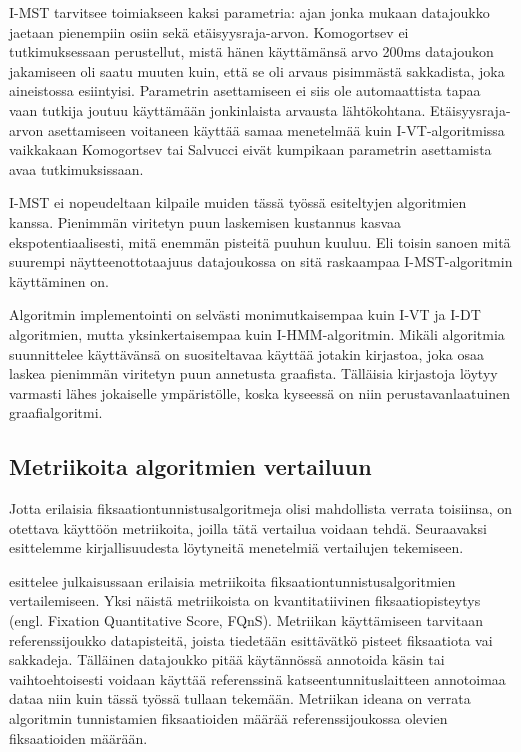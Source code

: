 I-MST tarvitsee toimiakseen kaksi parametria: ajan jonka mukaan datajoukko jaetaan pienempiin osiin sekä etäisyysraja-arvon. Komogortsev ei tutkimuksessaan perustellut, mistä hänen käyttämänsä arvo 200ms datajoukon jakamiseen oli saatu muuten kuin, että se oli arvaus pisimmästä sakkadista, joka aineistossa esiintyisi. Parametrin asettamiseen ei siis ole automaattista tapaa vaan tutkija joutuu käyttämään jonkinlaista arvausta lähtökohtana. Etäisyysraja-arvon asettamiseen voitaneen käyttää samaa menetelmää kuin I-VT-algoritmissa vaikkakaan Komogortsev tai Salvucci eivät kumpikaan parametrin asettamista avaa tutkimuksissaan.

I-MST ei nopeudeltaan kilpaile muiden tässä työssä esiteltyjen algoritmien kanssa. Pienimmän viritetyn puun laskemisen kustannus kasvaa ekspotentiaalisesti, mitä enemmän pisteitä puuhun kuuluu. Eli toisin sanoen mitä suurempi näytteenottotaajuus datajoukossa on sitä raskaampaa I-MST-algoritmin käyttäminen on. 

Algoritmin implementointi on selvästi monimutkaisempaa kuin I-VT ja I-DT algoritmien, mutta yksinkertaisempaa kuin I-HMM-algoritmin. Mikäli algoritmia suunnittelee käyttävänsä on suositeltavaa käyttää jotakin kirjastoa, joka osaa laskea pienimmän viritetyn puun annetusta graafista. Tälläisia kirjastoja löytyy varmasti lähes jokaiselle ympäristölle, koska kyseessä on niin perustavanlaatuinen graafialgoritmi.

\subsection{Metriikoita algoritmien vertailuun}
Jotta erilaisia fiksaationtunnistusalgoritmeja olisi mahdollista verrata toisiinsa, on otettava käyttöön metriikoita, joilla tätä vertailua voidaan tehdä. Seuraavaksi esittelemme kirjallisuudesta löytyneitä menetelmiä vertailujen tekemiseen.

\citet[s. 4]{komogortsev2010} esittelee julkaisussaan erilaisia metriikoita fiksaationtunnistusalgoritmien vertailemiseen. Yksi näistä metriikoista on kvantitatiivinen fiksaatiopisteytys (engl. Fixation Quantitative Score, FQnS). Metriikan käyttämiseen tarvitaan referenssijoukko datapisteitä, joista tiedetään esittävätkö pisteet fiksaatiota vai sakkadeja. Tälläinen datajoukko pitää käytännössä annotoida käsin tai vaihtoehtoisesti voidaan käyttää referenssinä katseentunnituslaitteen annotoimaa dataa niin kuin tässä työssä tullaan tekemään. Metriikan ideana on verrata algoritmin tunnistamien fiksaatioiden määrää referenssijoukossa olevien fiksaatioiden määrään.

